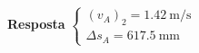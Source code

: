 
\textbf{Resposta}
$\begin{cases}
	(v_{A})_{2}=\SI{1.42}{\meter/\second}\\
	\Delta s_{A}=\SI{617.5}{\milli\meter}
\end{cases}
$